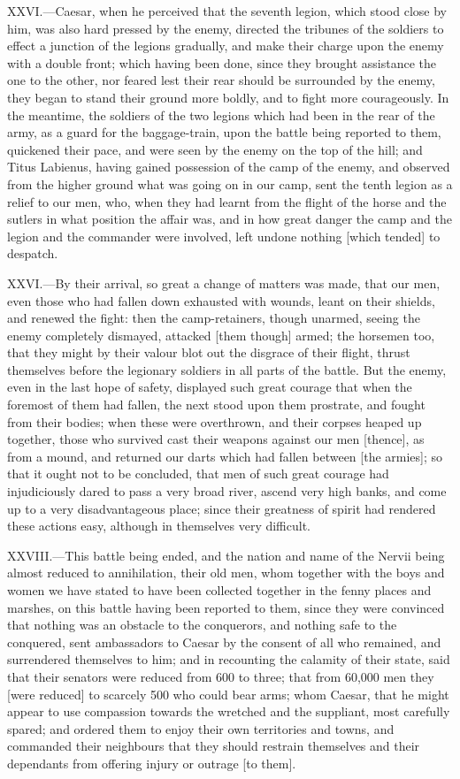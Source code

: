XXVI.—Caesar, when he perceived that the seventh legion, which stood
close by him, was also hard pressed by the enemy, directed the tribunes
of the soldiers to effect a junction of the legions gradually, and make
their charge upon the enemy with a double front; which having been done,
since they brought assistance the one to the other, nor feared lest
their rear should be surrounded by the enemy, they began to stand their
ground more boldly, and to fight more courageously. In the meantime, the
soldiers of the two legions which had been in the rear of the army, as a
guard for the baggage-train, upon the battle being reported to them,
quickened their pace, and were seen by the enemy on the top of the hill;
and Titus Labienus, having gained possession of the camp of the enemy,
and observed from the higher ground what was going on in our camp, sent
the tenth legion as a relief to our men, who, when they had learnt from
the flight of the horse and the sutlers in what position the affair was,
and in how great danger the camp and the legion and the commander were
involved, left undone nothing [which tended] to despatch.

XXVI.—By their arrival, so great a change of matters was made, that our
men, even those who had fallen down exhausted with wounds, leant on
their shields, and renewed the fight: then the camp-retainers, though
unarmed, seeing the enemy completely dismayed, attacked [them though]
armed; the horsemen too, that they might by their valour blot out the
disgrace of their flight, thrust themselves before the legionary
soldiers in all parts of the battle. But the enemy, even in the last
hope of safety, displayed such great courage that when the foremost of
them had fallen, the next stood upon them prostrate, and fought from
their bodies; when these were overthrown, and their corpses heaped up
together, those who survived cast their weapons against our men
[thence], as from a mound, and returned our darts which had fallen
between [the armies]; so that it ought not to be concluded, that men of
such great courage had injudiciously dared to pass a very broad river,
ascend very high banks, and come up to a very disadvantageous place;
since their greatness of spirit had rendered these actions easy,
although in themselves very difficult.

XXVIII.—This battle being ended, and the nation and name of the Nervii
being almost reduced to annihilation, their old men, whom together with
the boys and women we have stated to have been collected together in the
fenny places and marshes, on this battle having been reported to them,
since they were convinced that nothing was an obstacle to the
conquerors, and nothing safe to the conquered, sent ambassadors to
Caesar by the consent of all who remained, and surrendered themselves to
him; and in recounting the calamity of their state, said that their
senators were reduced from 600 to three; that from 60,000 men they [were
reduced] to scarcely 500 who could bear arms; whom Caesar, that he might
appear to use compassion towards the wretched and the suppliant, most
carefully spared; and ordered them to enjoy their own territories and
towns, and commanded their neighbours that they should restrain
themselves and their dependants from offering injury or outrage [to
them].

